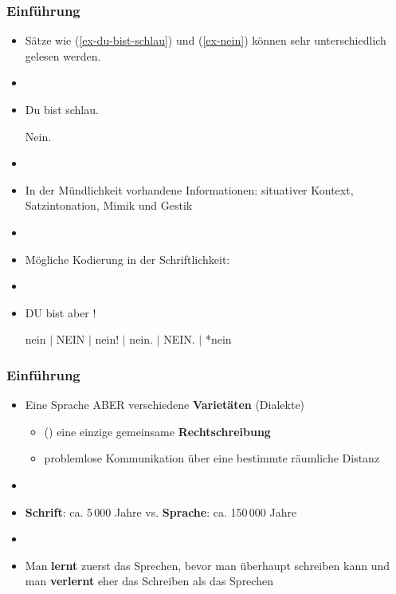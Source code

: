\begin{frame}
\frametitle{Einführung}

\begin{itemize}
	\item Sätze wie (\ref{ex-du-bist-schlau}) und (\ref{ex-nein}) können sehr unterschiedlich gelesen werden.
	\item[]
	\item[]
		
	  \ea\label{ex-du-bist-schlau}
          Du bist schlau.
          \z

	  \ea\label{ex-nein}
          Nein.
          \z
\pause		
	\item[]
	\item In der Mündlichkeit vorhandene Informationen: situativer Kontext, Satzintonation, Mimik und Gestik
	\item[]
	\item Mögliche Kodierung in der Schriftlichkeit:
	\item[]
	\item[]
		
	  \ea
          DU bist aber !
          \z
	  
	  \ea
          nein $|$ NEIN $|$ nein! $|$ nein. $|$ NEIN. $|$ *nein
          \z

\end{itemize}		

\end{frame}



\begin{frame}
\frametitle{Einführung}

\begin{itemize}
	\item Eine Sprache ABER verschiedene \textbf{Varietäten} (Dialekte)
	
	\begin{itemize}
		\item (\idR) eine einzige gemeinsame \textbf{Rechtschreibung}

		\item problemlose Kommunikation über eine bestimmte räumliche Distanz	

	\end{itemize}

	\item[]
	\item \textbf{Schrift}: ca. 5\,000 Jahre vs. \textbf{Sprache}: ca. 150\,000 Jahre
	\item[]
	\item Man \textbf{lernt} zuerst das Sprechen, bevor man überhaupt schreiben kann und man \textbf{verlernt} eher das Schreiben als das Sprechen
\end{itemize}


\end{frame}



